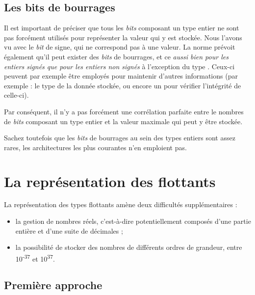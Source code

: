 \subsection{Les bits de bourrages}
\label{les-bits-de-bourrages}

Il est important de préciser que tous les \emph{bits} composant un type
entier ne sont pas forcément utilisés pour représenter la valeur qui y
est stockée. Nous l'avons vu avec le \emph{bit} de signe, qui ne
correspond pas à une valeur. La norme prévoit également qu'il peut
exister des \emph{bits} de bourrages, et ce \emph{aussi bien pour les
entiers signés que pour les entiers non signés} à l'exception du type
. Ceux-ci peuvent par exemple être employés pour maintenir
d'autres informations (par exemple : le type de la donnée stockée, ou
encore un
 pour vérifier l'intégrité de celle-ci).

\begin{attentionbox}
  Par conséquent, il n'y a pas forcément
une corrélation parfaite entre le nombres de \emph{bits} composant un
type entier et la valeur maximale qui peut y être stockée.
\end{attentionbox}


\begin{infobox}
  Sachez toutefois que les \emph{bits}
de bourrages au sein des types entiers sont assez rares, les
architectures les plus courantes n'en emploient pas.
\end{infobox}

\section{La représentation des flottants}
\label{la-representation-des-flottants}

La représentation des types flottants amène deux difficultés 
supplémentaires :

\begin{itemize}
\item
  la gestion de nombres réels, c'est-à-dire potentiellement composés
  d'une partie entière et d'une suite de décimales ;
\item
  la possibilité de stocker des nombres de différents ordres de
  grandeur, entre 10\textsuperscript{-37} et 10\textsuperscript{37}.
\end{itemize}

\subsection{Première approche}
\label{premiere-approche-2}

